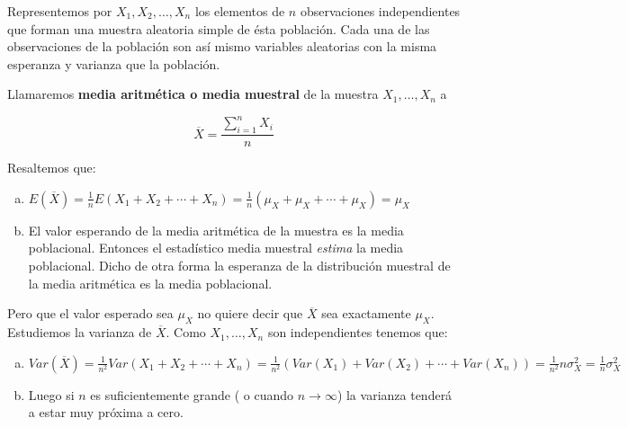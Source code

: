 \documentclass[12pt]{report}
\begin{document}
 Representemos por $X_{1}, X_{2},\ldots,X_{n}$ los elementos de
 $n$ observaciones independientes que forman
 una muestra aleatoria simple de ésta población. Cada una de las observaciones de
 la población son así mismo variables aleatorias con la misma esperanza y varianza que
 la población.

 Llamaremos \textbf{media aritmética o media muestral}  de la muestra
 $X_{1},\ldots,X_{n}$ a
 
 $$\overline{X}=\frac{\sum_{i=1}^n X_{i}}{n}$$

 
 Resaltemos que:

\begin{enumerate}[a)]
\item $E(\overline{X})=\frac{1}{n}E(X_{1}+X_{2}+\cdots
+X_{n})=\frac{1}{n}
 (\mu_{X}+\mu_{X}+\cdots+\mu_{X})=\mu_{X}$
 \item El valor esperando de la media aritmética de la muestra es la media
 poblacional. Entonces el estadístico media muestral \textit{estima}
 la media poblacional. Dicho de otra forma la esperanza de la
 distribución muestral de la media aritmética es la media poblacional.
\end{enumerate}



 Pero que el valor esperado sea $\mu_{X}$ no quiere decir que
 $\overline{X}$ sea exactamente $\mu_{X}$. Estudiemos la varianza de
 $\overline{X}$. Como  $X_{1},\ldots,X_{n}$ son independientes tenemos
 que:

\begin {enumerate}[a)]
\item $Var(\overline{X})=\frac{1}{n^2}Var(X_{1}+X_{2}+\cdots +X_{n})=
\frac{1}{n^2}(Var(X_{1})+Var(X_{2})+\cdots +Var(X_{n}))= \frac{1}{n^2}
n\sigma_{X}^2=\frac{1}{n} \sigma_{X}^2$
\item  Luego  si $n$ es suficientemente grande ( o cuando $n\to\infty$) la
 varianza tenderá a estar muy próxima a cero.
\end{enumerate}
\end{document}
